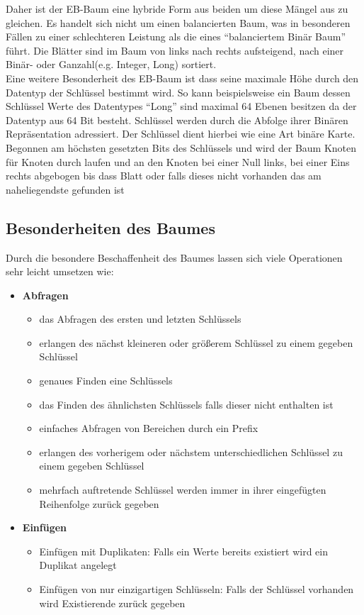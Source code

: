 \documentclass[a4paper,11pt,oneside,%
headsepline,												%
footsepline,												%
bibtotocnumbered									%
]{scrreprt}
\begin{document}
Daher ist der \ac{EB-Baum} eine hybride Form aus beiden um diese Mängel aus zu gleichen. Es handelt sich nicht um einen balancierten Baum, was in besonderen Fällen zu einer schlechteren Leistung als die eines \enquote{balanciertem Binär Baum} führt. Die Blätter sind im Baum von links nach rechts aufsteigend, nach einer Binär- oder Ganzahl(e.g. Integer, Long) sortiert.\\

Eine weitere Besonderheit des \ac{EB-Baum} ist dass seine maximale Höhe durch den Datentyp der Schlüssel bestimmt wird.
So kann beispielsweise ein Baum dessen Schlüssel Werte des Datentypes \enquote{Long} sind maximal 64 Ebenen besitzen da der Datentyp aus 64 Bit besteht. Schlüssel werden durch die Abfolge ihrer Binären Repräsentation adressiert. Der Schlüssel dient hierbei wie eine Art binäre Karte. Begonnen am höchsten gesetzten Bits des Schlüssels und wird der Baum Knoten für Knoten durch laufen und an den Knoten bei einer Null links, bei einer Eins rechts abgebogen bis dass Blatt oder falls dieses nicht vorhanden das am naheliegendste gefunden ist

\subsection{Besonderheiten des Baumes}
Durch die besondere Beschaffenheit des Baumes lassen sich viele Operationen sehr leicht umsetzen wie:
\begin{itemize}
	\item \textbf{Abfragen}
	\begin{itemize}
		\item das Abfragen des ersten und letzten Schlüssels
		\item erlangen des nächst kleineren oder größerem Schlüssel zu einem gegeben Schlüssel
		\item genaues Finden eine Schlüssels
		\item das Finden des ähnlichsten Schlüssels falls dieser nicht enthalten ist
		\item einfaches Abfragen von Bereichen durch ein Prefix
		\item erlangen des vorherigem oder nächstem unterschiedlichen Schlüssel zu einem gegeben Schlüssel
		\item mehrfach auftretende Schlüssel werden immer in ihrer eingefügten Reihenfolge zurück gegeben
	\end{itemize}
	\item \textbf{Einfügen}
	\begin{itemize}
		\item Einfügen mit Duplikaten: Falls ein Werte bereits existiert wird ein Duplikat angelegt
		\item Einfügen von nur einzigartigen Schlüsseln: Falls der Schlüssel vorhanden wird Existierende zurück gegeben
	\end{itemize}
\end{itemize}
\end{document}
